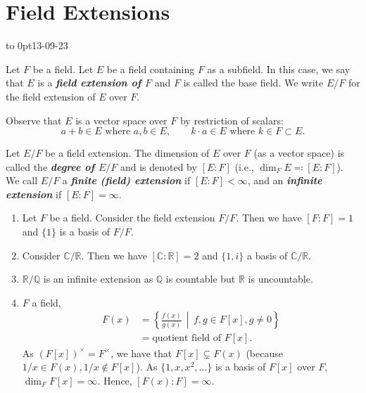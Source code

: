 \documentclass[twoside]{article}
\newcommand\Q{\mathbb Q}
\newcommand\R{\mathbb R}
\newcommand\C{\mathbb C}
\theoremstyle{remark}
\newcommand*\term[1]{\textbf{\textit{\mathversion{bold}#1}}}
\newcommand*\newclass[1]{\par\vbox to 0pt{\hbox{\tiny\sffamily\color{gray}#1}} \par\ignorespaces}
\begin{document}
\section{Field Extensions}

\newclass{13-09-23}

\begin{definition} 
  Let \(F\) be a field. Let \(E\) be a field containing \(F\) as a subfield. In this case, we say that \(E\) is a \term{field extension of \(F\)} and \(F\) is called the base field. We write \(E/F\) for the field extension of \(E\) over \(F\).
\end{definition}

Observe that \(E\) is a vector space over \(F\) by restriction of scalars:
\[ a+b \in E \text{ where } a,b \in E, \qquad k \cdot a \in E \text{ where } k \in F \subset E. \]

\begin{definition} 
  Let \(E/F\) be a field extension. The dimension of \(E\) over \(F\) (as a vector space) is called the \term{degree of \(E/F\)} and is denoted by \([E:F]\) (i.e., \(\dim_F E \eqcolon [E:F]\)). We call \(E/F\) a \term{finite (field) extension} if \([E:F] < \infty\), and an \term{infinite extension} if \([E:F] = \infty\).
\end{definition}

\begin{examples}
  \begin{enumerate}[label=\arabic*.]
    \item Let \(F\) be a field. Consider the field extension \(F/F\). Then we have \([F:F] = 1\) and \(\{1\}\) is a basis of \(F/F\).
    \item Consider \(\C/\R\). Then we have \([\C:\R]=2\) and \(\{1,i\}\) a basis of \(\C/\R\).
    \item \(\R/\Q\) is an infinite extension as \(\Q\) is countable but \(\R\) is uncountable.
    \item \(F\) a field,
    \begin{align*}
      F(x) & = \left\{ \frac{f(x)}{g(x)} \,\middle|\, f,g \in F[x], g \neq 0 \right\} \\
      & = \text{quotient field of \(F[x]\)}.
    \end{align*}
    As \((F[x])^\times = F^\times\), we have that \(F[x] \subsetneq F(x)\) (because \(1/x \in F(x), 1/x \notin F[x]\)). As \(\{1, x, x^2, \dots\}\) is a basis of \(F[x]\) over \(F\), \(\dim_F F[x] = \infty\). Hence, \([F(x):F] = \infty\).
  \end{enumerate}
\end{examples}
\end{document}
